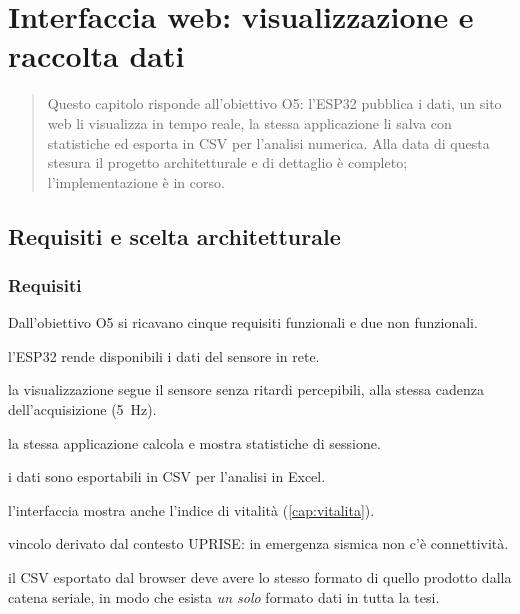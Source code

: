 \chapter{Interfaccia web: visualizzazione e raccolta dati}
\label{cap:webui}

\begin{quote}\small
Questo capitolo risponde all'obiettivo O5: l'ESP32 pubblica i dati, un sito web li
visualizza in tempo reale, la stessa applicazione li salva con statistiche ed
esporta in CSV per l'analisi numerica. Alla data di questa stesura il progetto
architetturale e di dettaglio è completo; l'implementazione è in corso.
\end{quote}

\section{Requisiti e scelta architetturale}
\label{sec:webui-requisiti}

\subsection{Requisiti}

Dall'obiettivo O5 si ricavano cinque requisiti funzionali e due non funzionali.

\begin{description}[leftmargin=1.4em,style=nextline,itemsep=2pt]
  \item[R1 --- Pubblicazione] l'ESP32 rende disponibili i dati del sensore in rete.
  \item[R2 --- Tempo reale] la visualizzazione segue il sensore senza ritardi
    percepibili, alla stessa cadenza dell'acquisizione (5~Hz).
  \item[R3 --- Statistiche] la stessa applicazione calcola e mostra statistiche di
    sessione.
  \item[R4 --- Esportazione] i dati sono esportabili in CSV per l'analisi in Excel.
  \item[R5 --- Vitalità] l'interfaccia mostra anche l'indice di vitalità
    (\cref{cap:vitalita}).
  \item[N1 --- Funzionamento offline] vincolo derivato dal contesto UPRISE: in
    emergenza sismica non c'è connettività.
  \item[N2 --- Coerenza dei dati] il CSV esportato dal browser deve avere lo stesso
    formato di quello prodotto dalla catena seriale, in modo che esista
    \emph{un solo} formato dati in tutta la tesi.
\end{description}


